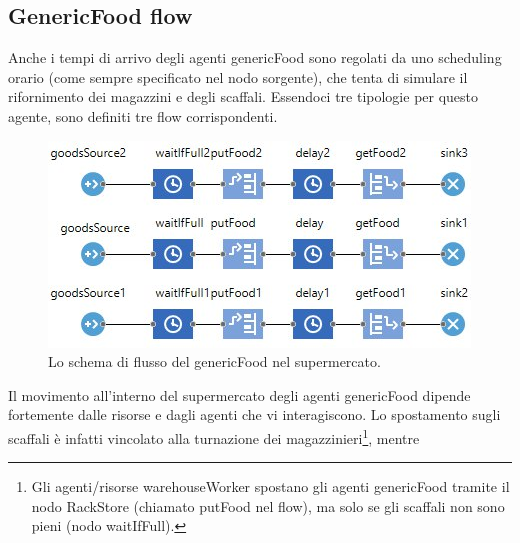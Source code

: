 \documentclass{article}
\begin{document}
\subsection{GenericFood flow}
Anche i tempi di arrivo degli agenti genericFood sono regolati da uno scheduling orario (come sempre specificato nel nodo sorgente), che tenta di simulare il rifornimento dei magazzini e degli scaffali. Essendoci tre tipologie per questo agente, sono definiti tre flow corrispondenti.

\begin{center}
\begin{figure}[h]
\center
\label{foodflow}
\includegraphics[scale=0.5]{./food_flow.jpeg}
\caption{\footnotesize{Lo schema di flusso del genericFood nel supermercato.}}
\end{figure}
\end{center}
Il movimento all'interno del supermercato degli agenti genericFood dipende fortemente dalle risorse e dagli agenti che vi interagiscono. Lo spostamento sugli scaffali è infatti vincolato alla turnazione dei magazzinieri\footnote{\footnotesize{Gli agenti/risorse warehouseWorker spostano gli agenti genericFood tramite il nodo RackStore (chiamato putFood nel flow), ma solo se gli scaffali non sono pieni (nodo waitIfFull).}}, mentre 
\end{document}
